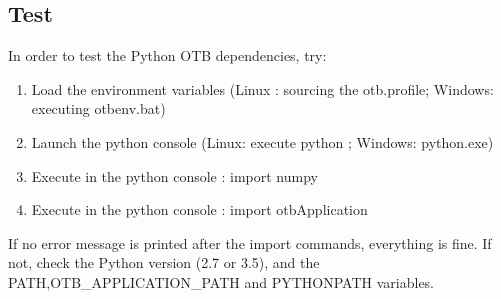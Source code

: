 \documentclass[10pt,a4paper]{article}
\begin{document}
\subsection{Test}
In order to test the Python OTB dependencies, try:
\begin{enumerate}
\item Load the environment variables (Linux : sourcing the otb.profile; Windows: executing otbenv.bat) 
\item Launch the python console (Linux: execute python ; Windows: python.exe)
\item Execute in the python console : import numpy
\item Execute in the python console : import otbApplication
\end{enumerate}
If no error message is printed after the import commands, everything is fine. If not, check the Python version (2.7 or 3.5), and the PATH,OTB\_APPLICATION\_PATH and PYTHONPATH variables.
\end{document}
